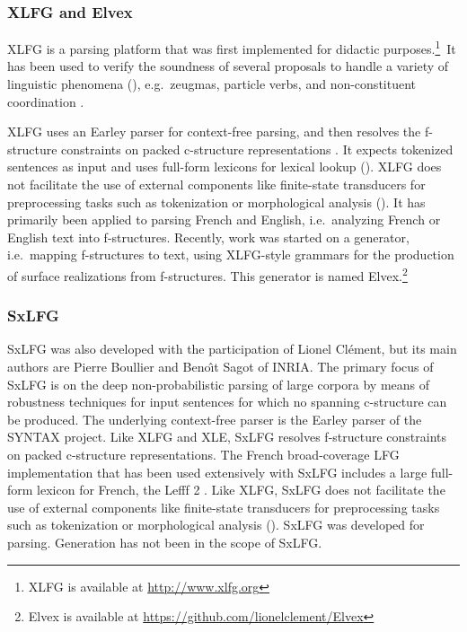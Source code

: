 \documentclass[output=paper,hidelinks]{langscibook}
\begin{document}
\subsubsection{XLFG and Elvex}

\noindent XLFG \citep{clementkinyon01} is a parsing platform that was first implemented for didactic purposes.\footnote{XLFG is available at \url{http://www.xlfg.org}}\ It has been used to verify the soundness of several proposals to handle a variety of linguistic phenomena (), e.g.\ zeugmas, particle verbs, and non-constituent coordination \citep{clement19}.

XLFG uses an Earley parser \citep{earley70} for context-free parsing, and then resolves the f-structure constraints on packed c-structure representations \citep{maxwellkaplan89,maxwellkaplan93}. It  expects tokenized sentences as input and uses full-form lexicons for lexical lookup (). XLFG does not facilitate the use of external components like finite-state transducers for preprocessing tasks such as tokenization or morphological analysis (). It has primarily been applied to parsing French and English, i.e.\ analyzing French or English text into f-structures. Recently, work was started on a generator, i.e.\ mapping f-structures to text, using XLFG-style grammars for the production of surface realizations from f-structures. This generator is named Elvex.\footnote{Elvex is available at \url{https://github.com/lionelclement/Elvex}}

\subsubsection{SxLFG}
        
SxLFG \citep{Boullier:2005:ERL:1654494.1654495} was also developed with the participation of Lionel Cl\'ement, but its main authors are Pierre Boullier and Beno\^{\i}t Sagot of INRIA. The primary focus of SxLFG is on the deep non-probabilistic parsing of large corpora \citep{sagot-boullier-2006-deep} by means of robustness techniques for input sentences for which no spanning c-structure can be produced. The underlying context-free parser is the Earley parser of the SYNTAX project. Like XLFG and XLE, SxLFG resolves f-structure constraints on packed c-structure representations. The French broad-coverage LFG implementation that has been used extensively with SxLFG includes a large full-form lexicon for French, the Lefff 2 \citep{sagotetal06}. Like XLFG, SxLFG does not facilitate the use of external components like finite-state transducers for preprocessing tasks such as tokenization or morphological analysis (). SxLFG was developed for parsing. Generation has not been in the scope of SxLFG.
 
\end{document}
